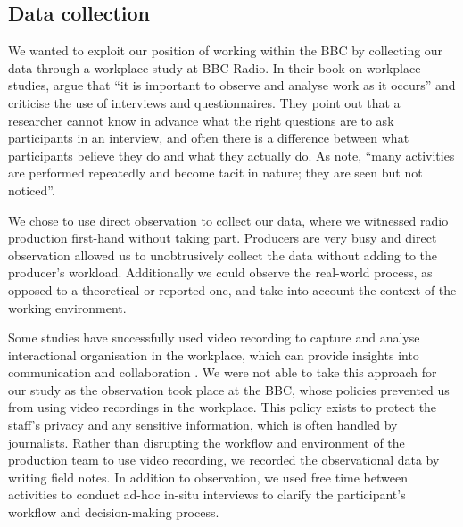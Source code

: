 \subsection{Data collection}


We wanted to exploit our position of working within the BBC by collecting our data through a workplace study at BBC
Radio.  In their book on workplace studies, \citet{Luff2000} argue that ``it is important to observe and analyse work
as it occurs'' and criticise the use of interviews and questionnaires. They point out that a researcher cannot know in
advance what the right questions are to ask participants in an interview, and often there is a difference between what
participants believe they do and what they actually do. As \citet[p.~245]{Luff2000} note, ``many activities are
performed repeatedly and become tacit in nature; they are seen but not noticed''.

We chose to use direct observation to collect our data, where we witnessed radio production first-hand without taking
part.  Producers are very busy and direct observation allowed us to unobtrusively collect the data without adding to
the producer's workload. Additionally we could observe the real-world process, as opposed to a theoretical or reported
one, and take into account the context of the working environment.

Some studies have successfully used video recording to capture and analyse interactional organisation in the workplace,
which can provide insights into communication and collaboration \citep[p.~16]{Luff2000}.  We were not able to take this
approach for our study as the observation took place at the BBC, whose policies prevented us from using video
recordings in the workplace.  This policy exists to protect the staff's privacy and any sensitive information, which is
often handled by journalists.  Rather than disrupting the workflow and environment of the production team to use video
recording, we recorded the observational data by writing field notes.  In addition to observation, we used free time
between activities to conduct ad-hoc in-situ interviews to clarify the participant's workflow and decision-making
process.


